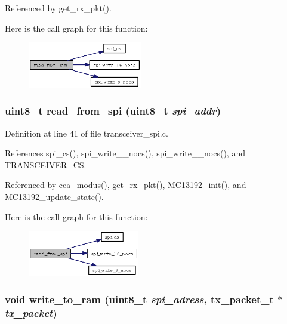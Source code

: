 Referenced by get\_\-rx\_\-pkt().

Here is the call graph for this function:\begin{figure}[H]
\begin{center}
\leavevmode
\includegraphics[width=141pt]{group__ro__transceiver__spi_gd0ae0e71ecdd034c8d3d627a28b4325c_cgraph}
\end{center}
\end{figure}
\subsubsection{\setlength{\rightskip}{0pt plus 5cm}uint8\_\-t read\_\-from\_\-spi (uint8\_\-t {\em spi\_\-addr})}\label{group__ro__transceiver__spi_gb94dfe7c6637b90955520ce14dffbfd2}




Definition at line 41 of file transceiver\_\-spi.c.

References spi\_\-cs(), spi\_\-write\_\_\-nocs(), spi\_\-write\_\_\-nocs(), and TRANSCEIVER\_\-CS.

Referenced by cca\_\-modus(), get\_\-rx\_\-pkt(), MC13192\_\-init(), and MC13192\_\-update\_\-state().

Here is the call graph for this function:\begin{figure}[H]
\begin{center}
\leavevmode
\includegraphics[width=138pt]{group__ro__transceiver__spi_gb94dfe7c6637b90955520ce14dffbfd2_cgraph}
\end{center}
\end{figure}
\subsubsection{\setlength{\rightskip}{0pt plus 5cm}void write\_\-to\_\-ram (uint8\_\-t {\em spi\_\-adress}, {\bf tx\_\-packet\_\-t} $\ast$ {\em tx\_\-packet})}\label{group__ro__transceiver__spi_g3b940cb98dd035ed3061a30b758adb9c}




